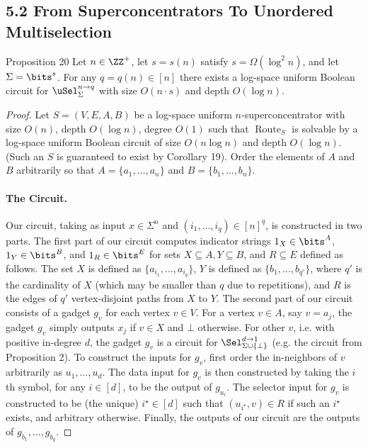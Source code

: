 \subsection*{5.2 From Superconcentrators To Unordered Multiselection}
\begin{originalresult}{Proposition 20}
Let $n\in\ZZ^+$, let $s=s(n)$ satisfy $s=\Omega(\log^2n)$, and let $\Sigma=\bits^s$. For any $q=q(n)\in[n]$ there exists a log-space uniform Boolean circuit for $\uSel_\Sigma^{n\to q}$ with size $O(n\cdot s)$ and depth $O(\log n)$.
\end{originalresult}
\begin{proof}
Let $S=(V,E,A,B)$ be a log-space uniform $n$-superconcentrator with size $O(n)$, depth $O(\log n)$, degree $O(1)$ such that $\operatorname{Route}_S$ is solvable by a log-space uniform Boolean circuit of size $O(n\log n)$ and depth $O(\log n)$. (Such an $S$ is guaranteed to exist by Corollary 19). Order the elements of $A$ and $B$ arbitrarily so that $A=\{a_1,\ldots,a_n\}$ and $B=\{b_1,\ldots,b_n\}$.
\paragraph{The Circuit.} Our circuit, taking as input $x\in\Sigma^n$ and $(i_1,\ldots,i_q)\in[n]^q$, is constructed in two parts.
The first part of our circuit computes indicator strings $1_X\in\bits^A$, $1_Y\in\bits^B$, and $1_R\in\bits^E$ for sets $X\subseteq A,Y\subseteq B$, and $R\subseteq E$ defined as follows. The set $X$ is defined as $\{a_{i_1},\ldots,a_{i_q}\}$, $Y$ is defined as $\{b_1,\ldots,b_{q'}\}$, where $q'$ is the cardinality of $X$ (which may be smaller than $q$ due to repetitions), and $R$ is the edges of $q'$ vertex-disjoint paths from $X$ to $Y$.
The second part of our circuit consists of a gadget $g_v$ for each vertex $v\in V$. For a vertex $v\in A$, say $v=a_j$, the gadget $g_v$ simply outputs $x_j$ if $v\in X$ and $\bot$ otherwise. For other $v$, i.e. with positive in-degree $d$, the gadget $g_v$ is a circuit for $\Sel_{\Sigma\cup\{\bot\}}^{d\to1}$ (e.g. the circuit from Proposition 2). To construct the inputs for $g_v$, first order the in-neighbors of $v$ arbitrarily as $u_1,\ldots,u_d$. The data input for $g_v$ is then constructed by taking the $i$th symbol, for any $i\in[d]$, to be the output of $g_{u_i}$. The selector input for $g_v$ is constructed to be (the unique) $i^\star\in[d]$ such that $(u_{i^\star},v)\in R$ if such an $i^\star$ exists, and arbitrary otherwise.
Finally, the outputs of our circuit are the outputs of $g_{b_1},\ldots,g_{b_q}$.

\end{proof}
